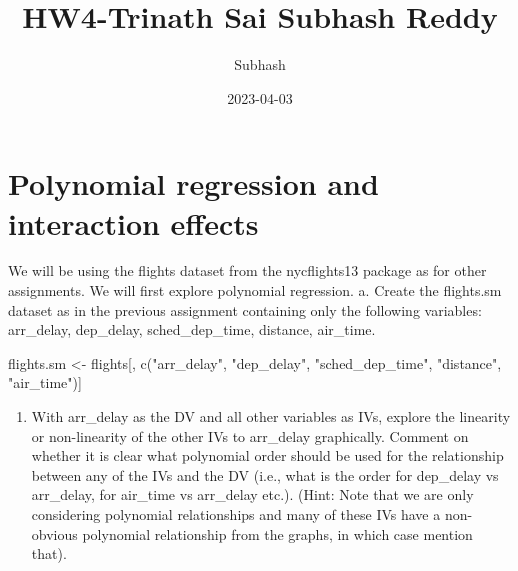 \documentclass[
]{article}
\title{HW4-Trinath Sai Subhash Reddy}
\author{Subhash}
\date{2023-04-03}
\newenvironment{Shaded}{\begin{snugshade}}{\end{snugshade}}
\newcommand{\FunctionTok}[1]{\textcolor[rgb]{0.00,0.00,0.00}{#1}}
\newcommand{\NormalTok}[1]{#1}
\newcommand{\OtherTok}[1]{\textcolor[rgb]{0.56,0.35,0.01}{#1}}
\newcommand{\StringTok}[1]{\textcolor[rgb]{0.31,0.60,0.02}{#1}}
\providecommand{\tightlist}{%
  \setlength{\itemsep}{0pt}\setlength{\parskip}{0pt}}
\begin{document}
\maketitle

\hypertarget{polynomial-regression-and-interaction-effects}{%
\section{Polynomial regression and interaction
effects}\label{polynomial-regression-and-interaction-effects}}

We will be using the flights dataset from the nycflights13 package as
for other assignments. We will first explore polynomial regression. a.
Create the flights.sm dataset as in the previous assignment containing
only the following variables: arr\_delay, dep\_delay, sched\_dep\_time,
distance, air\_time.

\begin{Shaded}
\begin{Highlighting}[]
\NormalTok{flights.sm }\OtherTok{\textless{}{-}}\NormalTok{ flights[, }\FunctionTok{c}\NormalTok{(}\StringTok{"arr\_delay"}\NormalTok{, }\StringTok{"dep\_delay"}\NormalTok{, }\StringTok{"sched\_dep\_time"}\NormalTok{,}
    \StringTok{"distance"}\NormalTok{, }\StringTok{"air\_time"}\NormalTok{)]}
\end{Highlighting}
\end{Shaded}

\begin{enumerate}
\def\labelenumi{\alph{enumi}.}
\setcounter{enumi}{1}
\tightlist
\item
  With arr\_delay as the DV and all other variables as IVs, explore the
  linearity or non-linearity of the other IVs to arr\_delay graphically.
  Comment on whether it is clear what polynomial order should be used
  for the relationship between any of the IVs and the DV (i.e., what is
  the order for dep\_delay vs arr\_delay, for air\_time vs arr\_delay
  etc.). (Hint: Note that we are only considering polynomial
  relationships and many of these IVs have a non-obvious polynomial
  relationship from the graphs, in which case mention that).
\end{enumerate}
\end{document}
